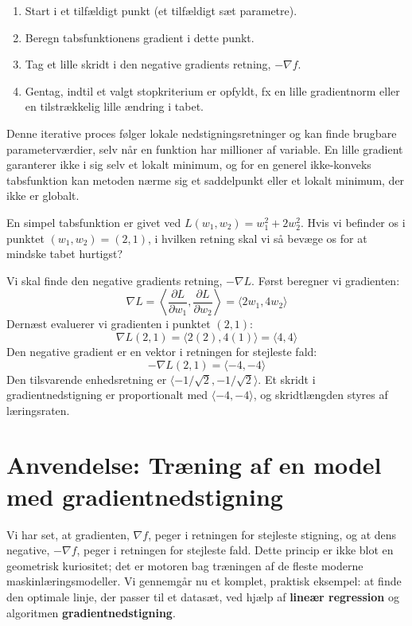 \begin{enumerate}
    \item Start i et tilfældigt punkt (et tilfældigt sæt parametre).
    \item Beregn tabsfunktionens gradient i dette punkt.
    \item Tag et lille skridt i den negative gradients retning, \( -\nabla f \).
    \item Gentag, indtil et valgt stopkriterium er opfyldt, fx en lille gradientnorm eller en tilstrækkelig lille ændring i tabet.
\end{enumerate}

Denne iterative proces følger lokale nedstigningsretninger og kan finde brugbare parameterværdier, selv når en funktion har millioner af variable. En lille gradient garanterer ikke i sig selv et lokalt minimum, og for en generel ikke-konveks tabsfunktion kan metoden nærme sig et saddelpunkt eller et lokalt minimum, der ikke er globalt.

\begin{example}

En simpel tabsfunktion er givet ved \( L(w_1, w_2) = w_1^2 + 2w_2^2 \). Hvis vi befinder os i punktet \((w_1, w_2) = (2, 1)\), i hvilken retning skal vi så bevæge os for at mindske tabet hurtigst?
\end{example}
\begin{solution}
Vi skal finde den negative gradients retning, \( -\nabla L \).
Først beregner vi gradienten:
\[
\nabla L = \left\langle \frac{\partial L}{\partial w_1}, \frac{\partial L}{\partial w_2} \right\rangle = \langle 2w_1, 4w_2 \rangle
\]
Dernæst evaluerer vi gradienten i punktet \((2, 1)\):
\[
\nabla L(2, 1) = \langle 2(2), 4(1) \rangle = \langle 4, 4 \rangle
\]
Den negative gradient er en vektor i retningen for stejleste fald:
\[
-\nabla L(2, 1) = \langle -4, -4 \rangle
\]
Den tilsvarende enhedsretning er $\langle-1/\sqrt{2},-1/\sqrt{2}\rangle$. Et skridt i gradientnedstigning er proportionalt med $\langle-4,-4\rangle$, og skridtlængden styres af læringsraten.
\end{solution}

\section{Anvendelse: Træning af en model med gradientnedstigning}

Vi har set, at gradienten, \(\nabla f\), peger i retningen for stejleste stigning, og at dens negative, \(-\nabla f\), peger i retningen for stejleste fald. Dette princip er ikke blot en geometrisk kuriositet; det er motoren bag træningen af de fleste moderne maskinlæringsmodeller. Vi gennemgår nu et komplet, praktisk eksempel: at finde den optimale linje, der passer til et datasæt, ved hjælp af \textbf{lineær regression} og algoritmen \textbf{gradientnedstigning}.

